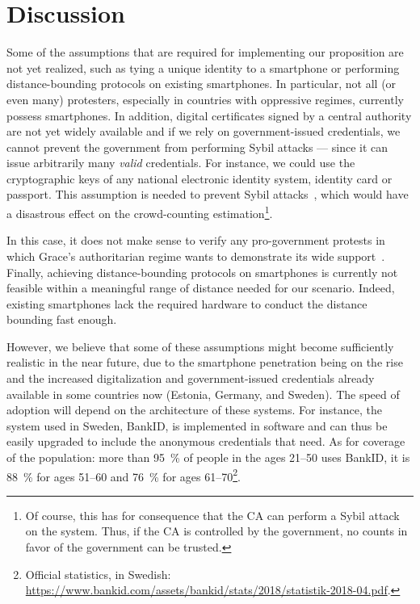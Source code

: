 \section{Discussion}%
\label{Discussion}


Some of the assumptions that are required for implementing our proposition are not yet realized, such as tying a unique identity to a smartphone or performing distance-bounding protocols on existing smartphones. 
In particular, not all (or even many) protesters, especially in countries with oppressive regimes, currently possess smartphones.
In addition, digital certificates signed by a central authority are not yet widely available and if we rely on government-issued credentials, we cannot prevent the government from performing Sybil attacks --- since it can issue arbitrarily many \emph{valid} credentials.  For instance, we could use the cryptographic keys of any national electronic identity system, identity card or passport.
This assumption is needed to prevent Sybil attacks~\cite{SybilAttack}, which would have a disastrous effect on the crowd-counting estimation\footnote{
Of course, this has for consequence that the \ac{CA} can perform a Sybil attack on the system.
Thus, if the \ac{CA} is controlled by the government, no counts in favor of the government can be trusted.
}.

In this case, it does not make sense to verify any pro-government protests in which Grace's authoritarian regime wants to demonstrate its wide support~\cite{AlJazeeraOnVenezuela2017,VenezuelanStateWorkersCalledToParticipate}.
Finally, achieving distance-bounding protocols on smartphones is currently not feasible within a meaningful range of distance needed for our scenario.
Indeed, existing smartphones lack the required hardware to conduct the distance bounding fast enough.

However, we believe that some of these assumptions might become sufficiently realistic in the near future, due to the smartphone penetration being on the rise and the increased digitalization and government-issued credentials already available in some countries now (\eg Estonia, Germany, and Sweden). 
The speed of adoption will depend on the architecture of these systems.
For instance, the system used in Sweden, BankID, is implemented in software and can thus be easily upgraded to include the anonymous credentials that \CROCUS need.
As for coverage of the population: more than \SI{95}{\%} of people in the ages 21--50 uses BankID, it is \SI{88}{\%} for ages 51--60 and \SI{76}{\%} for ages 61--70\footnote{Official statistics, in Swedish:  \url{https://www.bankid.com/assets/bankid/stats/2018/statistik-2018-04.pdf}.}.

